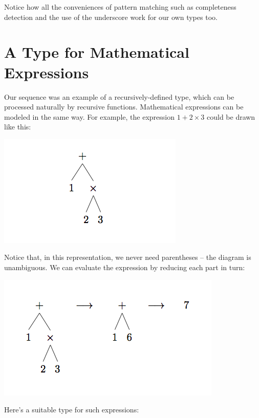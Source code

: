 \documentclass[]{book}
\newcommand{\smspace}{\vspace{4mm}}
\begin{document}
\noindent Notice how all the conveniences of pattern matching such as completeness detection and the use of the underscore work for our own types too.

\section*{A Type for Mathematical Expressions}

Our \textrm{sequence} was an example of a recursively-defined type, which can be processed naturally by recursive functions. Mathematical expressions can be modeled in the same way. For example, the expression $1 + 2 \times 3$ could be drawn like this:

\smspace
\includegraphics{kindlefig1.png}
\smspace

\noindent Notice that, in this representation, we never need parentheses -- the diagram is unambiguous. We can evaluate the expression by reducing each part in turn:

\smspace
\includegraphics{kindlefig2.png}
\smspace

\noindent Here's a suitable type for such expressions:
\end{document}
